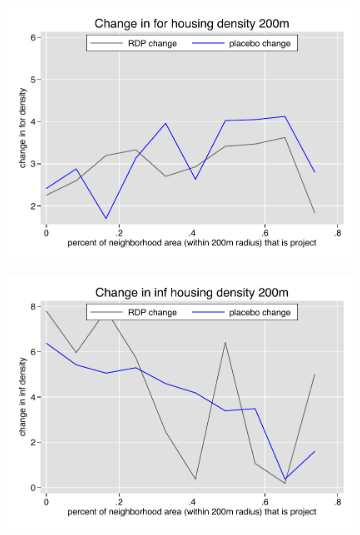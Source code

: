 \documentclass[12pt]{article}
\begin{document}
\begin{figure}
        \begin{subfigure}[b]{0.495\textwidth}
            \centering
            \includegraphics[width=\textwidth,trim={0.3cm .3cm 0.1cm 0cm}, clip=true]{figures/change_for_200_local.pdf}
        \end{subfigure}
        \hfill
        \begin{subfigure}[b]{0.495\textwidth}  
            \centering 
            \includegraphics[width=\textwidth,trim={0.3cm .3cm 0.1cm 0cm}, clip=true]{figures/change_inf_200_local.pdf}
        \end{subfigure}
        \vspace{-6mm}
    \end{figure} 
\end{document}
